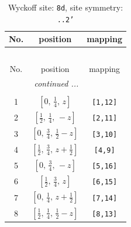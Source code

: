 \documentclass[fleqn,8pt]{jsarticle}
\begin{document}
\begin{longtable}{ccc}
\caption{Wyckoff site: {\tt 8d}, site symmetry: {\tt ..2'}}
 \\
 \hline \hline
No. & position & mapping \\ \hline \endfirsthead

\multicolumn{2}{l}{\tablename\ \thetable{}} \\
 \hline \hline
No. & position & mapping \\ \hline \endhead

 \hline \hline
\multicolumn{2}{r}{\footnotesize\it continued ...} \\ \endfoot

 \hline \hline
\multicolumn{2}{r}{} \\ \endlastfoot

1 & $\left[ 0,\, \frac{1}{4},\, z \right]$ & {\tt [1,12]} \\ \hline
2 & $\left[ \frac{1}{2},\, \frac{1}{4},\, - z \right]$ & {\tt [2,11]} \\ \hline
3 & $\left[ 0,\, \frac{3}{4},\, \frac{1}{2} - z \right]$ & {\tt [3,10]} \\ \hline
4 & $\left[ \frac{1}{2},\, \frac{3}{4},\, z + \frac{1}{2} \right]$ & {\tt [4,9]} \\ \hline
5 & $\left[ 0,\, \frac{3}{4},\, - z \right]$ & {\tt [5,16]} \\ \hline
6 & $\left[ \frac{1}{2},\, \frac{3}{4},\, z \right]$ & {\tt [6,15]} \\ \hline
7 & $\left[ 0,\, \frac{1}{4},\, z + \frac{1}{2} \right]$ & {\tt [7,14]} \\ \hline
8 & $\left[ \frac{1}{2},\, \frac{1}{4},\, \frac{1}{2} - z \right]$ & {\tt [8,13]} \\
\end{longtable}
\renewcommand{\arraystretch}{1.2}
\end{document}
